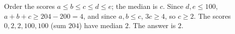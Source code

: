 Order the scores $a\le b\le c\le d\le e$; the median is $c$. Since $d,e\le100$, $a+b+c\ge204-200=4$, and since $a,b\le c$, $3c\ge4$, so $c\ge2$. The scores $0,2,2,100,100$ (sum $204$) have median $2$. The answer is $\boxed{2}$.
